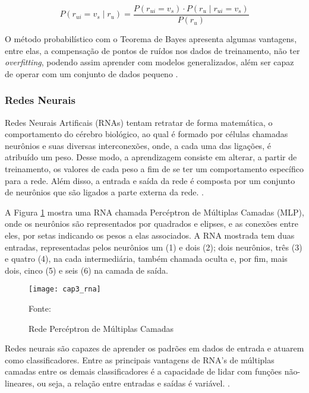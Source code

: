         \begin{equation}
              P(r_{ui} = v_s \mid r_u) = \frac{P(r_{ui}=v_s) \cdot P(r_u \mid r_{ui} = v_s)}{P(r_u)}
        \end{equation}
        
        O método probabilístico com o Teorema de Bayes apresenta algumas vantagens, entre elas, a compensação de pontos de ruídos nos dados de treinamento, não ter \textit{overfitting}, podendo assim aprender com modelos generalizados, além ser capaz de operar com um conjunto de dados pequeno \cite{Jannach2010}.
                
        \subsubsection{Redes Neurais}
        Redes Neurais Artificais (RNAs) tentam retratar de forma matemática, o comportamento do cérebro biológico, ao qual é formado por células chamadas neurônios e suas diversas interconexões, onde, a cada uma das ligações, é atribuído um peso. Desse modo, a aprendizagem consiste em alterar, a partir de treinamento, os valores de cada peso a fim de se ter um comportamento específico para a rede. Além disso, a entrada e saída da rede é composta por um conjunto de neurônios que são ligados a parte externa da rede. \cite{Russell2009}. 
        
        A Figura \ref{fig:cap3_rna} mostra uma RNA chamada Percéptron de Múltiplas Camadas (MLP), onde os neurônios são representados por quadrados e elipses, e as conexões entre eles, por setas indicando os pesos a elas associados. A RNA mostrada tem duas entradas, representadas pelos neurônios um (1) e dois (2); dois neurônios, três (3) e quatro (4), na cada intermediária, também chamada oculta e, por fim, mais dois, cinco (5) e seis (6) na camada de saída.
        
        \begin{figure}[htb]        
            \caption{Rede Percéptron de Múltiplas Camadas}
            \texttt{[image: cap3\_rna]}
            \label{fig:cap3_rna}
            
            \footnotesize{Fonte: }
        \end{figure}
        
        Redes neurais são capazes de aprender os padrões em dados de entrada e atuarem como classificadores. Entre as principais vantagens de RNA's de múltiplas camadas entre os demais classificadores é a capacidade de lidar com funções não-lineares, ou seja, a relação entre entradas e saídas é variável. \cite{Aggarwal2016}.
        
